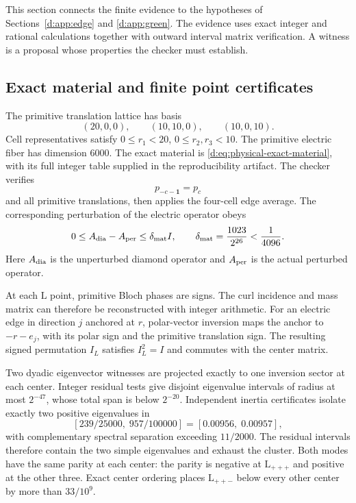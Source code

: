 This section connects the finite evidence to the hypotheses of
Sections~\ref{d:app:edge} and \ref{d:app:green}. The evidence uses exact
integer and rational calculations together with outward interval matrix
verification. A witness is a proposal whose properties the checker must
establish.

\subsection{Exact material and finite point certificates}

The primitive translation lattice has basis
\[
 (20,0,0),\qquad(10,10,0),\qquad(10,0,10).
\]
Cell representatives satisfy \(0\le r_1<20\), \(0\le r_2,r_3<10\).
The primitive electric fiber has dimension 6000. The exact material is
\eqref{d:eq:physical-exact-material}, with its full integer table supplied
in the reproducibility artifact. The checker verifies
\[
 p_{-c-\boldsymbol1}=p_c
\]
and all primitive translations, then applies the four-cell edge average.
The corresponding perturbation of the electric operator obeys
\begin{equation}
 0\le A_{\rm dia}-A_{\rm per}\le\delta_{\rm mat} I,
 \qquad \delta_{\rm mat}=\frac{1023}{2^{26}}<\frac1{4096}.
 \label{d:eq:appendix-material-perturbation}
\end{equation}
Here \(A_{\rm dia}\) is the unperturbed diamond operator and
\(A_{\rm per}\) is the actual perturbed operator.

At each \(\mathrm{L}\) point, primitive Bloch phases are signs. The curl incidence
and mass matrix can therefore be reconstructed with integer arithmetic.
For an electric edge in direction \(j\) anchored at \(r\), polar-vector
inversion maps the anchor to \(-r-e_j\), with its polar sign and the
primitive translation sign. The resulting signed permutation \(I_L\)
satisfies \(I_L^2=I\) and commutes with the center matrix.

Two dyadic eigenvector witnesses are projected exactly to one inversion
sector at each center. Integer residual tests give disjoint eigenvalue
intervals of radius at most \(2^{-47}\), whose total span is below
\(2^{-20}\). Independent inertia certificates isolate exactly two
positive eigenvalues in
\[
 [239/25000,\;957/100000]=[0.00956,\;0.00957],
\]
with complementary spectral separation exceeding \(11/2000\).
The residual intervals therefore contain the two simple eigenvalues
and exhaust the cluster. Both modes have the same parity at each center:
the parity is negative at \(\mathrm{L}_{+++}\) and positive at the other three.
Exact center ordering places \(\mathrm{L}_{++-}\) below every other center by more
than \(33/10^9\).

